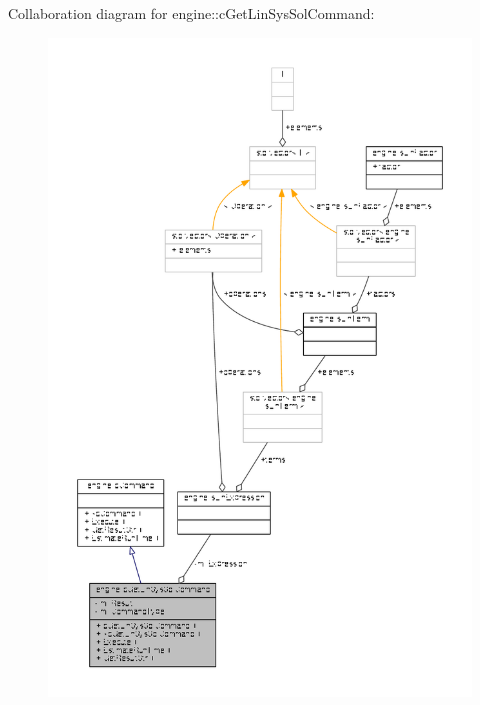 Collaboration diagram for engine\-:\-:c\-Get\-Lin\-Sys\-Sol\-Command\-:
\nopagebreak
\begin{figure}[H]
\begin{center}
\leavevmode
\includegraphics[width=350pt]{classengine_1_1cGetLinSysSolCommand__coll__graph}
\end{center}
\end{figure}
